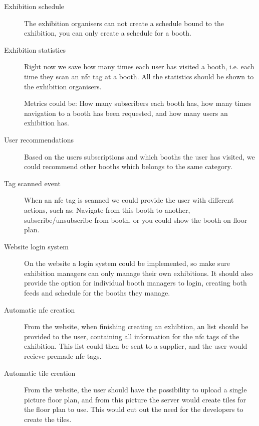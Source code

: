 \begin{description}
\item[Exhibition schedule] The exhibition organisers can not create a schedule bound to the exhibition, you can only create a schedule for a booth.%
\item[Exhibition statistics] Right now we save how many times each user has visited a booth, i.e. each time they scan an \ac{nfc} tag at a booth. All the statistics should be shown to the exhibition organisers.

Metrics could be: How many subscribers each booth has, how many times navigation to a booth has been requested, and how many users an exhibition has.
\item[User recommendations] Based on the users subscriptions and which booths the user has visited, we could recommend other booths which belongs to the same category.
\item[Tag scanned event] When an \ac{nfc} tag is scanned we could provide the user with different actions, such as: Navigate from this booth to another, subscribe/unsubscribe from booth, or you could show the booth on floor plan.
\item[Website login system] On the website a login system could be implemented, so make sure exhibition managers can only manage their own exhibitions. It should also provide the option for individual booth managers to login, creating both feeds and schedule for the booths they manage.
\item[Automatic \ac{nfc} creation] From the website, when finishing creating an exhibtion, an list should be provided to the user, containing all information for the \ac{nfc} tags of the exhibition. This list could then be sent to a supplier, and the user would recieve premade \ac{nfc} tags.
\item[Automatic tile creation] From the website, the user should have the possibility to upload a single picture floor plan, and from this picture the server would create tiles for the floor plan to use. This would cut out the need for the developers to create the tiles.
\end{description}

